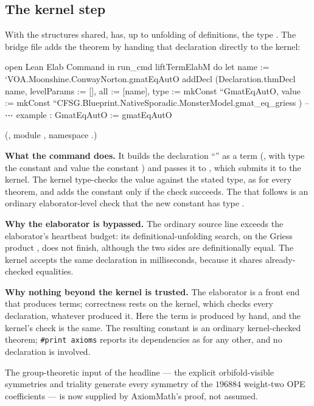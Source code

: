\subsection{The kernel step}

With the structures shared,  has, up to unfolding of definitions, the type .  The
bridge file adds the theorem  by handing that declaration directly to the kernel:
\begin{leancode}
open Lean Elab Command in
run_cmd liftTermElabM do
  let name := `VOA.Moonshine.ConwayNorton.gmatEqAutO
  addDecl (Declaration.thmDecl
    { name, levelParams := [], all := [name], type := mkConst ``GmatEqAutO,
      value := mkConst ``CFSG.Blueprint.NativeSporadic.MonsterModel.gmat_eq_griess })
-- ⋯
example : GmatEqAutO := gmatEqAutO
\end{leancode}
(, module
, namespace .)
\begin{dictionary}
\textbf{What the command does.}  It builds the declaration ``'' as a
term (, with type the constant  and value the constant ) and
passes it to , which submits it to the kernel.  The kernel type-checks the value against the stated type, as for
every theorem, and adds the constant only if the check succeeds.  The  that follows is an ordinary
elaborator-level check that the new constant has type .

\textbf{Why the elaborator is bypassed.}  The ordinary source line  exceeds the
elaborator's heartbeat budget: its definitional-unfolding search, on the Griess product , does not finish,
although the two sides are definitionally equal.  The kernel accepts the same declaration in milliseconds, because it shares
already-checked equalities.

\textbf{Why nothing beyond the kernel is trusted.}  The elaborator is a front end that produces terms; correctness rests on
the kernel, which checks every declaration, whatever produced it.  Here the term is produced by hand, and the kernel's check
is the same.  The resulting constant is an ordinary kernel-checked theorem; \texttt{\#print axioms} reports its dependencies as
for any other, and no  declaration is involved.
\end{dictionary}
\begin{physics}
The group-theoretic input of the headline --- the explicit orbifold-visible symmetries and triality generate every symmetry of
the $196884$ weight-two OPE coefficients --- is now supplied by AxiomMath's proof, not assumed.
\end{physics}

